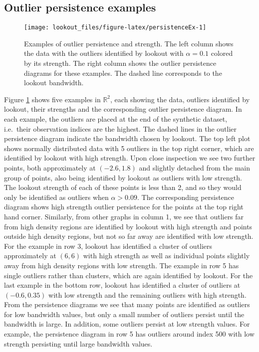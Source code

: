 \documentclass[
]{article}
\begin{document}
\hypertarget{sec:PersistenceExamples}{%
\subsection{Outlier persistence
examples}\label{sec:PersistenceExamples}}

\begin{figure}
\texttt{[image: lookout\_files/figure-latex/persistenceEx-1]} \caption{Examples of outlier persistence and strength. The left column shows the data with the outliers identified by lookout with $\alpha = 0.1$ colored by its strength. The right column shows the outlier persistence diagrams for these examples. The dashed line corresponds to the lookout bandwidth.}\label{fig:persistenceEx}
\end{figure}

Figure \ref{fig:persistenceEx} shows five examples in \(\mathbb{R}^2\),
each showing the data, outliers identified by lookout, their strengths
and the corresponding outlier persistence diagram. In each example, the
outliers are placed at the end of the synthetic dataset, i.e.~their
observation indices are the highest. The dashed lines in the outlier
persistence diagram indicate the bandwidth chosen by lookout. The top
left plot shows normally distributed data with 5 outliers in the top
right corner, which are identified by lookout with high strength. Upon
close inspection we see two further points, both approximately at
\((-2.6, 1.8)\) and slightly detached from the main group of points,
also being identified by lookout as outliers with low strength. The
lookout strength of each of these points is less than 2, and so they
would only be identified as outliers when \(\alpha > 0.09\). The
corresponding persistence diagram shows high strength outlier
persistence for the points at the top right hand corner. Similarly, from
other graphs in column 1, we see that outliers far from high density
regions are identified by lookout with high strength and points outside
high density regions, but not so far away are identified with low
strength. For the example in row 3, lookout has identified a cluster of
outliers approximately at \((6,6)\) with high strength as well as
individual points slightly away from high density regions with low
strength. The example in row 5 has single outliers rather than clusters,
which are again identified by lookout. For the last example in the
bottom row, lookout has identified a cluster of outliers at
\((-0.6, 0.35)\) with low strength and the remaining outliers with high
strength. From the persistence diagrams we see that many points are
identified as outliers for low bandwidth values, but only a small number
of outliers persist until the bandwidth is large. In addition, some
outliers persist at low strength values. For example, the persistence
diagram in row 5 has outliers around index 500 with low strength
persisting until large bandwidth values.
\end{document}
